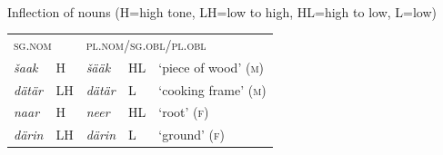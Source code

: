 \documentclass[output=collectionpaper]{langsci/langscibook}
\begin{document}
\ea
\label{ex:Lilje:9}
\\
\begin{xlist}
\ex
Inflection of nouns (H=high tone, LH=low to high, HL=high to low, L=low) \citep[36]{Baart1999}\\
\medskip
\begin{tabular}{lllll}
\multicolumn{2}{l}{\textsc{sg.nom}}  & 	\multicolumn{3}{l}{\textsc{pl.nom/sg.obl/pl.obl}} \\
\itshape šaak  & H  &  \itshape šääk &  HL &  `piece of wood' (\textsc{m}) \\
\itshape dätär &  LH &\itshape    dätär &  L &  `cooking frame' (\textsc{m}) \\
\itshape naar &  H &   \itshape neer &  HL &  `root' (\textsc{f}) \\
\itshape därin &  LH &   \itshape därin &  L &  `ground' (\textsc{f}) \\
\end{tabular}


\end{xlist}
\end{document}
